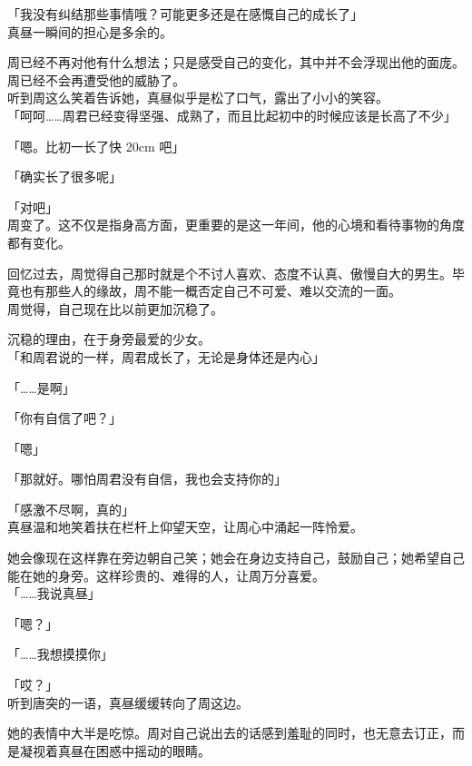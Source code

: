「我没有纠结那些事情哦？可能更多还是在感慨自己的成长了」\\

真昼一瞬间的担心是多余的。

周已经不再对他有什么想法；只是感受自己的变化，其中并不会浮现出他的面庞。周已经不会再遭受他的威胁了。\\

听到周这么笑着告诉她，真昼似乎是松了口气，露出了小小的笑容。\\

「呵呵……周君已经变得坚强、成熟了，而且比起初中的时候应该是长高了不少」

「嗯。比初一长了快 20cm 吧」

「确实长了很多呢」

「对吧」\\

周变了。这不仅是指身高方面，更重要的是这一年间，他的心境和看待事物的角度都有变化。

回忆过去，周觉得自己那时就是个不讨人喜欢、态度不认真、傲慢自大的男生。毕竟也有那些人的缘故，周不能一概否定自己不可爱、难以交流的一面。\\

周觉得，自己现在比以前更加沉稳了。

沉稳的理由，在于身旁最爱的少女。\\

「和周君说的一样，周君成长了，无论是身体还是内心」

「……是啊」

「你有自信了吧？」

「嗯」

「那就好。哪怕周君没有自信，我也会支持你的」

「感激不尽啊，真的」\\

真昼温和地笑着扶在栏杆上仰望天空，让周心中涌起一阵怜爱。

她会像现在这样靠在旁边朝自己笑；她会在身边支持自己，鼓励自己；她希望自己能在她的身旁。这样珍贵的、难得的人，让周万分喜爱。\\

「……我说真昼」

「嗯？」

「……我想摸摸你」

「哎？」\\

听到唐突的一语，真昼缓缓转向了周这边。

她的表情中大半是吃惊。周对自己说出去的话感到羞耻的同时，也无意去订正，而是凝视着真昼在困惑中摇动的眼睛。\\

